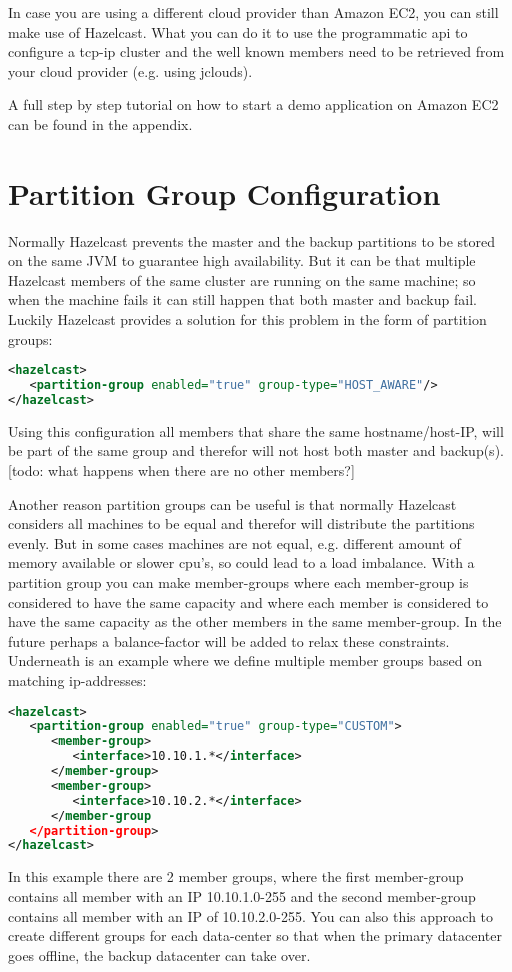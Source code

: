 In case you are using a different cloud provider than Amazon EC2, you can still make use of Hazelcast. What you can do it to use the programmatic api to configure a tcp-ip cluster and the well known members need to be retrieved from your cloud provider (e.g. using jclouds).

A full step by step tutorial on how to start a demo application on Amazon EC2 can be found in the appendix.

\section{Partition Group Configuration}
Normally Hazelcast prevents the master and the backup partitions to be stored on the same JVM to guarantee high availability. But it can be that multiple Hazelcast members of the same cluster are running on the same machine; so when the machine fails it can still happen that both master and backup fail. Luckily Hazelcast provides a solution for this problem in the form of partition groups:
\begin{lstlisting}[language=xml]
<hazelcast>
   <partition-group enabled="true" group-type="HOST_AWARE"/>
</hazelcast>
\end{lstlisting}
Using this configuration all members that share the same hostname/host-IP, will be part of the same group and therefor will not host both master and backup(s). [todo: what happens when there are no other members?] 

Another reason partition groups can be useful is that normally Hazelcast considers all machines to be equal and therefor will distribute the partitions evenly. But in some cases machines are not equal, e.g. different amount of memory available or slower cpu's, so could lead to a load imbalance. With a partition group you can make member-groups where each member-group is considered to have the same capacity and where each member is considered to have the same capacity as the other members in the same member-group. In the future perhaps a balance-factor will be added to relax these constraints. Underneath is an example where we define multiple member groups based on matching ip-addresses:
\begin{lstlisting}[language=xml]
<hazelcast>
   <partition-group enabled="true" group-type="CUSTOM">
      <member-group>
         <interface>10.10.1.*</interface>
      </member-group>
      <member-group>
         <interface>10.10.2.*</interface>
      </member-group
   </partition-group>
</hazelcast>
\end{lstlisting}
In this example there are 2 member groups, where the first member-group contains all member with an IP 10.10.1.0-255 and the second member-group contains all member with an IP of 10.10.2.0-255. You can also this approach to create different groups for each data-center so that when the primary datacenter goes offline, the backup datacenter can take over.

